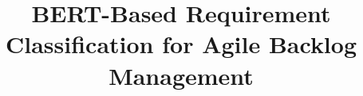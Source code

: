 \documentclass[conference,10pt,letterpaper]{IEEEtran}
\begin{document}
\title{BERT-Based Requirement Classification for Agile Backlog Management}
\author{}
\end{document}
